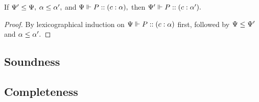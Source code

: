 \begin{lemma}[Subtyping]
  \label{bi-sub}
  If $\Psi' \le \Psi,$ $\alpha \le \alpha',$ and $\Psi \Vdash P :: (c : \alpha),$ then $\Psi' \Vdash P :: (c : \alpha').$
\end{lemma}
\begin{proof}
  By lexicographical induction on $\Psi \Vdash P :: (c : \alpha)$ first, followed by $\Psi \le \Psi'$ and $\alpha \le \alpha'.$
\end{proof}

\subsection{Soundness}

\subsection{Completeness}
